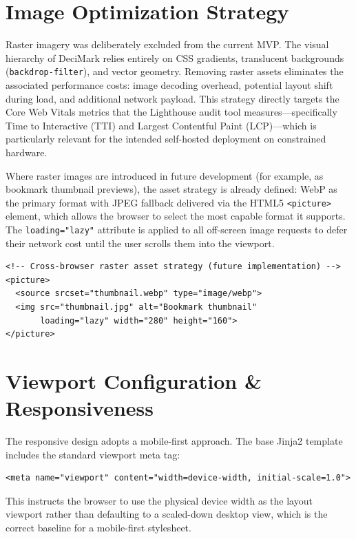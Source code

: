 \documentclass[11pt,a4paper]{book}
\begin{document}
\section{Image Optimization Strategy}

Raster imagery was deliberately excluded from the current MVP. The visual hierarchy of DeciMark relies entirely on CSS gradients, translucent backgrounds (\texttt{backdrop-filter}), and vector geometry. Removing raster assets eliminates the associated performance costs: image decoding overhead, potential layout shift during load, and additional network payload. This strategy directly targets the Core Web Vitals metrics that the Lighthouse audit tool measures---specifically Time to Interactive (TTI) and Largest Contentful Paint (LCP)---which is particularly relevant for the intended self-hosted deployment on constrained hardware.

Where raster images are introduced in future development (for example, as bookmark thumbnail previews), the asset strategy is already defined: WebP as the primary format with JPEG fallback delivered via the HTML5 \texttt{<picture>} element, which allows the browser to select the most capable format it supports. The \texttt{loading="lazy"} attribute is applied to all off-screen image requests to defer their network cost until the user scrolls them into the viewport.

\begin{verbatim}
<!-- Cross-browser raster asset strategy (future implementation) -->
<picture>
  <source srcset="thumbnail.webp" type="image/webp">
  <img src="thumbnail.jpg" alt="Bookmark thumbnail"
       loading="lazy" width="280" height="160">
</picture>
\end{verbatim}

\section{Viewport Configuration \& Responsiveness}

The responsive design adopts a mobile-first approach. The base Jinja2 template includes the standard viewport meta tag:

\begin{verbatim}
<meta name="viewport" content="width=device-width, initial-scale=1.0">
\end{verbatim}

This instructs the browser to use the physical device width as the layout viewport rather than defaulting to a scaled-down desktop view, which is the correct baseline for a mobile-first stylesheet.
\end{document}
